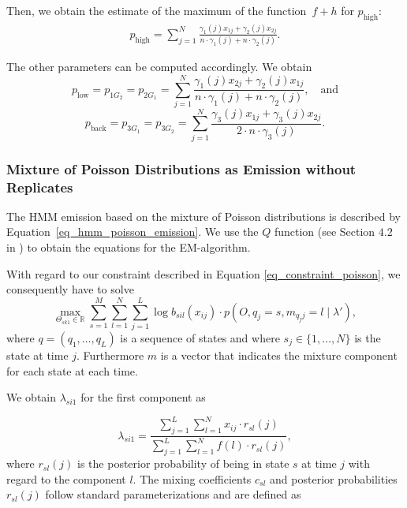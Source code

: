 \noindent
Then, we obtain the estimate of the maximum of the function~$f+h$ for $p_{\text{high}}$:
\begin{align*}
 \hat{p}_{\text{high}} = \sum_{j=1}^N \frac{\gamma_1(j) x_{1j} + \gamma_2(j) x_{2j}}{n \cdot \gamma_1(j) + n \cdot \gamma_2(j)}.
\end{align*}

\noindent
The other parameters can be computed accordingly.
We obtain
$$p_{\text{low}} = p_{1G_2}=p_{2G_1}=\sum_{j=1}^N \frac{\gamma_1(j) x_{2j} + \gamma_2(j) x_{1j} }{n \cdot \gamma_1(j) + n \cdot \gamma_2(j) }, \quad \text{and}$$
$$p_{\text{back}} = p_{3G_1}=p_{3G_2}=\sum_{j=1}^N \frac{\gamma_3(j) x_{1j} + \gamma_3(j) x_{2j} }{2 \cdot n \cdot \gamma_3(j)}.$$


\subsubsection{Mixture of Poisson Distributions as Emission without Replicates}
The HMM emission based on the mixture of Poisson distributions is described by Equation~\ref{eq_hmm_poisson_emission}.
We use the $Q$ function (see Section $4.2$ in \cite{bilmes1997}) to obtain the equations for the EM-algorithm.

\noindent
With regard to our constraint described in Equation \ref{eq_constraint_poisson}, we consequently have to solve 
$$\max_{\Theta_{sk1} \in \mathbb{R}}\sum_{s=1}^M\sum_{l=1}^N\sum_{j=1}^L \log b_{sil}(x_{ij}) \cdot p(O, q_j = s, m_{q_jj} = l \mid \lambda'),$$
where $q=(q_1, \ldots, q_L)$ is a sequence of states and where $s_j \in \{1, \ldots, N\}$ is the state at time $j$.
Furthermore $m$ is a vector that indicates the mixture component for each state at each time.

\noindent
We obtain $\lambda_{si1}$ for the first component as

$$\lambda_{si1} = \frac{\sum_{j=1}^L \sum_{l=1}^N x_{ij} \cdot r_{sl}(j)}{\sum_{j=1}^L \sum_{l=1}^N f(l) \cdot r_{sl}(j)},$$
\noindent
where $r_{sl}(j)$ is the posterior probability of being in state $s$ at time $j$ with regard to the component $l$. 
The mixing coefficients $c_{sl}$ and posterior probabilities $r_{sl}(j)$ follow standard parameterizations and are defined as

